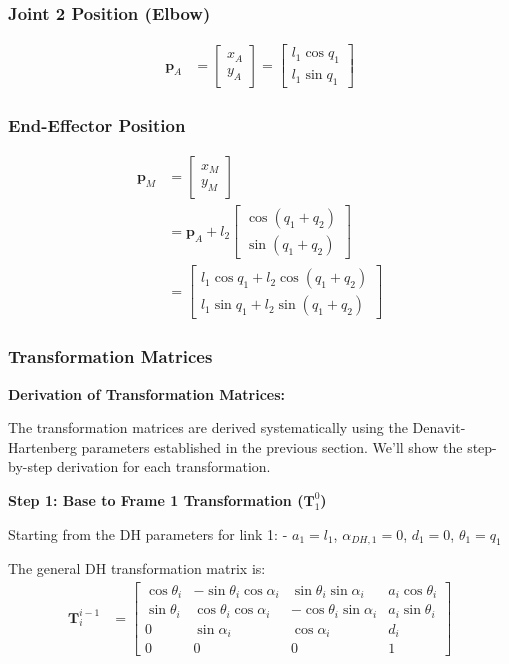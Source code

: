 \documentclass[11pt,a4paper]{article}
\begin{document}
\subsubsection{Joint 2 Position (Elbow)}
\begin{align}
\bm{p}_A &= \begin{bmatrix} x_A \\ y_A \end{bmatrix} = \begin{bmatrix} l_1 \cos q_1 \\ l_1 \sin q_1 \end{bmatrix}
\end{align}

\subsubsection{End-Effector Position}
\begin{align}
\bm{p}_M &= \begin{bmatrix} x_M \\ y_M \end{bmatrix} \\
&= \bm{p}_A + l_2 \begin{bmatrix} \cos(q_1 + q_2) \\ \sin(q_1 + q_2) \end{bmatrix} \\
&= \begin{bmatrix} l_1 \cos q_1 + l_2 \cos(q_1 + q_2) \\ l_1 \sin q_1 + l_2 \sin(q_1 + q_2) \end{bmatrix}
\end{align}

\subsubsection{Transformation Matrices}

\textbf{Derivation of Transformation Matrices:}

The transformation matrices are derived systematically using the Denavit-Hartenberg parameters established in the previous section. We'll show the step-by-step derivation for each transformation.

\textbf{Step 1: Base to Frame 1 Transformation ($\bm{T}_1^0$)}

Starting from the DH parameters for link 1:
- $a_1 = l_1$, $\alpha_{DH,1} = 0$, $d_1 = 0$, $\theta_1 = q_1$

The general DH transformation matrix is:
\begin{align}
\bm{T}_i^{i-1} &= \begin{bmatrix}
\cos\theta_i & -\sin\theta_i\cos\alpha_i & \sin\theta_i\sin\alpha_i & a_i\cos\theta_i \\
\sin\theta_i & \cos\theta_i\cos\alpha_i & -\cos\theta_i\sin\alpha_i & a_i\sin\theta_i \\
0 & \sin\alpha_i & \cos\alpha_i & d_i \\
0 & 0 & 0 & 1
\end{bmatrix}
\end{align}
\end{document}
